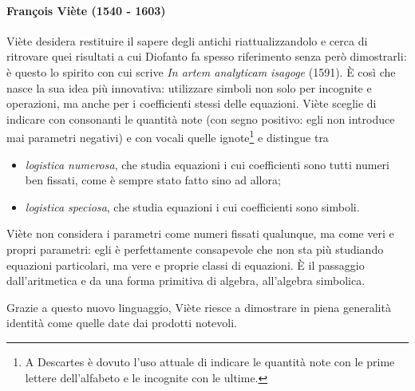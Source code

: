 \paragraph{Fran\c{c}ois Vi\`ete (1540 - 1603)} Vi\`ete desidera restituire il sapere degli antichi riattualizzandolo e cerca di ritrovare quei risultati a cui Diofanto fa spesso riferimento senza per\`o dimostrarli: \`e questo lo spirito con cui scrive \textit{In artem analyticam isagoge} (1591). \`E cos\`i che nasce la sua idea pi\`u innovativa: utilizzare simboli non solo per incognite e operazioni, ma anche per i coefficienti stessi delle equazioni. Vi\`ete sceglie di indicare con consonanti le quantit\`a note (con segno positivo: egli non introduce mai parametri negativi) e con vocali quelle ignote\footnote{A Descartes \`e dovuto l'uso attuale di indicare le quantit\`a note con le prime lettere dell'alfabeto e le incognite con le ultime.} e distingue tra
\begin{itemize}
	\item \textit{logistica numerosa}, che studia equazioni i cui coefficienti sono tutti numeri ben fissati, come \`e sempre stato fatto sino ad allora;
	\item \textit{logistica speciosa}, che studia equazioni i cui coefficienti sono simboli.
\end{itemize}
\par Vi\`ete non considera i parametri come numeri fissati qualunque, ma come veri e propri parametri: egli \`e perfettamente consapevole che non sta pi\`u studiando equazioni particolari, ma vere e proprie classi di equazioni. \`E il passaggio dall'aritmetica e da una forma primitiva di algebra, all'algebra simbolica.
\par Grazie a questo nuovo linguaggio, Vi\`ete riesce a dimostrare in piena generalit\`a identit\`a come quelle date dai prodotti notevoli.
